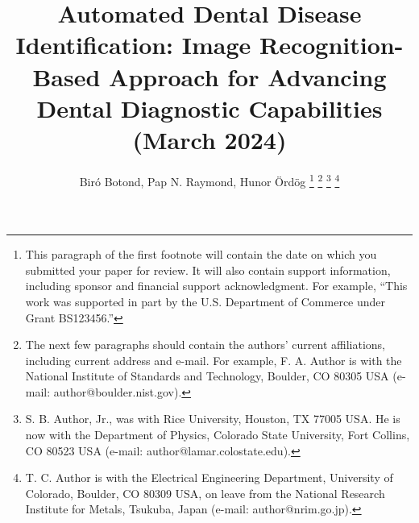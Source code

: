 \documentclass[journal,twoside,web]{ieeecolor}
\begin{document}
\title{Automated Dental Disease Identification: Image Recognition-Based Approach for Advancing Dental Diagnostic Capabilities (March 2024)}
\author{Biró Botond, Pap N. Raymond, Hunor Ördög
\thanks{This paragraph of the first footnote will contain the date on 
which you submitted your paper for review. It will also contain support 
information, including sponsor and financial support acknowledgment. For 
example, ``This work was supported in part by the U.S. Department of 
Commerce under Grant BS123456.'' }
\thanks{The next few paragraphs should contain 
the authors' current affiliations, including current address and e-mail. For 
example, F. A. Author is with the National Institute of Standards and 
Technology, Boulder, CO 80305 USA (e-mail: author@boulder.nist.gov). }
\thanks{S. B. Author, Jr., was with Rice University, Houston, TX 77005 USA. He is 
now with the Department of Physics, Colorado State University, Fort Collins, 
CO 80523 USA (e-mail: author@lamar.colostate.edu).}
\thanks{T. C. Author is with 
the Electrical Engineering Department, University of Colorado, Boulder, CO 
80309 USA, on leave from the National Research Institute for Metals, 
Tsukuba, Japan (e-mail: author@nrim.go.jp).}
}

\maketitle
\end{document}
